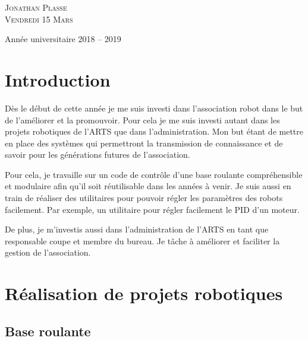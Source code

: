 \documentclass[11pt,a4paper]{report}
\begin{document}
\begin{titlepage}
\begin{sffamily}
\begin{center}
      \textsc{\Large Jonathan Plasse}\\[1cm]

      \textsc{\large Vendredi 15 Mars}



      \vfill

      {\large Année universitaire 2018 -- 2019}

    \end{center}
  \end{sffamily}
\end{titlepage}

\renewcommand{\thepage}{\roman{page}}

\tableofcontents %



\chapter*{Introduction}
  \renewcommand{\thepage}{\arabic{page}}
  \setcounter{page}{1}

  Dès le début de cette année je me suis investi dans l'association robot dans le but de l'améliorer et la promouvoir.
  Pour cela je me suis investi autant dans les projets robotiques de l'ARTS que dans l'administration.
  Mon but étant de mettre en place des systèmes qui permettront la transmission de connaissance et de savoir pour les générations futures de l'association.

  Pour cela, je travaille sur un code de contr\^ole d'une base roulante compréhensible et modulaire afin qu'il soit réutilisable dans les années à venir.
  Je suis aussi en train de réaliser des utilitaires pour pouvoir régler les paramètres des robots facilement. Par exemple, un utilitaire pour régler facilement le PID d'un moteur.

  De plus, je m'investis aussi dans l'administration de l'ARTS en tant que responsable coupe et membre du bureau. Je t\^ache à améliorer et faciliter la gestion de l'association.

\chapter{Réalisation de projets robotiques}


  \section{Base roulante}
\end{document}
